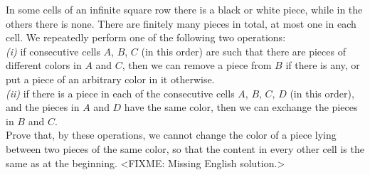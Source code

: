 \problem
In some cells of an infinite square row there is a black or white piece, while
in the others there is none.
There are finitely many pieces in total, at most one in each cell.
We repeatedly perform one of the following two operations:
\\\emph{(i)}
if consecutive cells $A$, $B$, $C$ (in this order) are such that there are
pieces of different colors in $A$ and $C$, then we can remove a piece from $B$
if there is any, or put a piece of an arbitrary color in it otherwise.
\\\emph{(ii)}
if there is a piece in each of the consecutive cells $A$, $B$, $C$, $D$
(in this order), and the pieces in $A$ and $D$ have the same color, then we can
exchange the pieces in $B$ and $C$.
\\Prove that, by these operations, we cannot change the color of a piece lying
between two pieces of the same color, so that the content in every other cell
is the same as at the beginning.
\solution
<FIXME: Missing English solution.>
\endproblem
